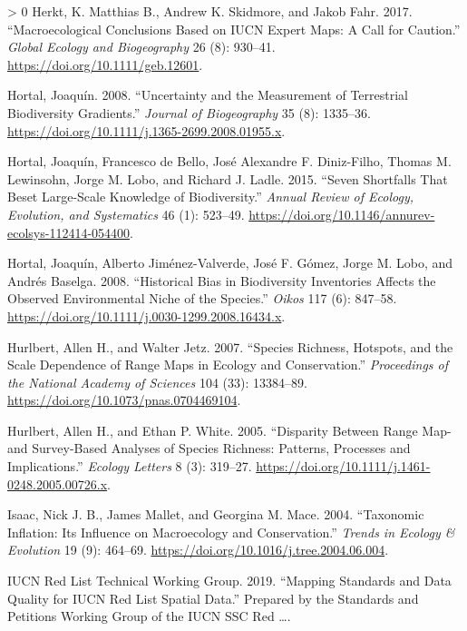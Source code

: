 \documentclass[10pt,oneside]{article}
\newlength{\cslhangindent}
\newenvironment{CSLReferences}[3] %
 {%
  \setlength{\parindent}{0pt}
  \ifodd #1 \everypar{\setlength{\hangindent}{\cslhangindent}}\ignorespaces\fi
  \ifnum #2 > 0
  \setlength{\parskip}{#2\baselineskip}
  \fi
 }%
 {}
\begin{document}
\begin{CSLReferences}{1}{0}
\leavevmode\hypertarget{ref-Herkt2017MacCon}{}%
Herkt, K. Matthias B., Andrew K. Skidmore, and Jakob Fahr. 2017.
{``Macroecological Conclusions Based on IUCN Expert Maps: A Call for
Caution.''} \emph{Global Ecology and Biogeography} 26 (8): 930--41.
\url{https://doi.org/10.1111/geb.12601}.

\leavevmode\hypertarget{ref-Hortal2008UncMea}{}%
Hortal, Joaquín. 2008. {``Uncertainty and the Measurement of Terrestrial
Biodiversity Gradients.''} \emph{Journal of Biogeography} 35 (8):
1335--36. \url{https://doi.org/10.1111/j.1365-2699.2008.01955.x}.

\leavevmode\hypertarget{ref-Hortal2015SevSho}{}%
Hortal, Joaquín, Francesco de Bello, José Alexandre F. Diniz-Filho,
Thomas M. Lewinsohn, Jorge M. Lobo, and Richard J. Ladle. 2015. {``Seven
Shortfalls That Beset Large-Scale Knowledge of Biodiversity.''}
\emph{Annual Review of Ecology, Evolution, and Systematics} 46 (1):
523--49. \url{https://doi.org/10.1146/annurev-ecolsys-112414-054400}.

\leavevmode\hypertarget{ref-Hortal2008HisBia}{}%
Hortal, Joaquín, Alberto Jiménez-Valverde, José F. Gómez, Jorge M. Lobo,
and Andrés Baselga. 2008. {``Historical Bias in Biodiversity Inventories
Affects the Observed Environmental Niche of the Species.''} \emph{Oikos}
117 (6): 847--58.
\url{https://doi.org/10.1111/j.0030-1299.2008.16434.x}.

\leavevmode\hypertarget{ref-Hurlbert2007SpeRic}{}%
Hurlbert, Allen H., and Walter Jetz. 2007. {``Species Richness,
Hotspots, and the Scale Dependence of Range Maps in Ecology and
Conservation.''} \emph{Proceedings of the National Academy of Sciences}
104 (33): 13384--89. \url{https://doi.org/10.1073/pnas.0704469104}.

\leavevmode\hypertarget{ref-Hurlbert2005DisRan}{}%
Hurlbert, Allen H., and Ethan P. White. 2005. {``Disparity Between Range
Map- and Survey-Based Analyses of Species Richness: Patterns, Processes
and Implications.''} \emph{Ecology Letters} 8 (3): 319--27.
\url{https://doi.org/10.1111/j.1461-0248.2005.00726.x}.

\leavevmode\hypertarget{ref-Isaac2004TaxInf}{}%
Isaac, Nick J. B., James Mallet, and Georgina M. Mace. 2004.
{``Taxonomic Inflation: Its Influence on Macroecology and
Conservation.''} \emph{Trends in Ecology \& Evolution} 19 (9): 464--69.
\url{https://doi.org/10.1016/j.tree.2004.06.004}.

\leavevmode\hypertarget{ref-IUCN2019MapSta}{}%
IUCN Red List Technical Working Group. 2019. {``Mapping Standards and
Data Quality for IUCN Red List Spatial Data.''} Prepared by the
Standards and Petitions Working Group of the IUCN SSC Red \ldots.


\end{CSLReferences}
\end{document}
